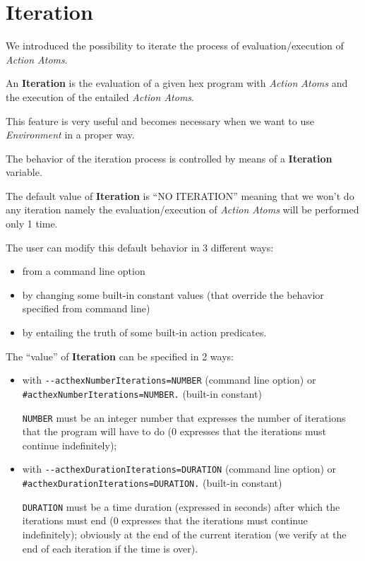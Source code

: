 \documentclass[a4paper, 11pt]{article}
\newcommand{\Iteration}{\textbf{Iteration}\xspace}
\begin{document}
	\section*{Iteration}
		We introduced the possibility to iterate the process of evaluation/execution of \textit{Action Atoms}.

		An \Iteration is the evaluation of a given hex program with \textit{Action Atoms} and the execution of the entailed \textit{Action Atoms}.

		This feature is very useful and becomes necessary when we want to use \textit{Environment} in a proper way.

		\vspace*{1em}

		The behavior of the iteration process is controlled by means of a \Iteration variable.

		The default value of \Iteration is ``NO ITERATION'' meaning that we won't do any iteration namely the evaluation/execution of \textit{Action Atoms} will be performed only 1 time.

		\vspace*{1em}

		The user can modify this default behavior in 3 different ways:
		\begin{itemize}
			\item from a command line option
			\item by changing some built-in constant values (that override the behavior specified from command line)
			\item by entailing the truth of some built-in action predicates.
		\end{itemize}

		\vspace*{1em}

		The ``value'' of \Iteration can be specified in 2 ways:
		\begin{itemize}
			\item with \verb|--acthexNumberIterations=NUMBER| (command line option) or \verb|#acthexNumberIterations=NUMBER.| (built-in constant)

				\verb|NUMBER| must be an integer number that expresses the number of iterations that the program will have to do (0 expresses that the iterations must continue indefinitely);

			\item with \verb|--acthexDurationIterations=DURATION| (command line option) or \verb|#acthexDurationIterations=DURATION.| (built-in constant)

				\verb|DURATION| must be a time duration (expressed in seconds) after which the iterations must end (0 expresses that the iterations must continue indefinitely); obviously at the end of the current iteration (we verify at the end of each iteration if the time is over).
		\end{itemize}
\end{document}
